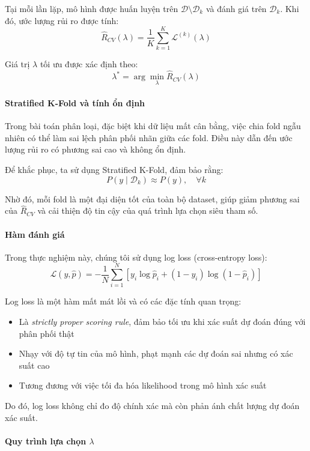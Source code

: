 Tại mỗi lần lặp, mô hình được huấn luyện trên $\mathcal{D} \setminus \mathcal{D}_k$ và đánh giá trên $\mathcal{D}_k$. Khi đó, ước lượng rủi ro được tính:
\[
\hat{R}_{CV}(\lambda) = \frac{1}{K} \sum_{k=1}^{K} \mathcal{L}^{(k)}(\lambda)
\]

Giá trị $\lambda$ tối ưu được xác định theo:
\[
\lambda^* = \arg\min_{\lambda} \hat{R}_{CV}(\lambda)
\]

\paragraph{Stratified K-Fold và tính ổn định}

Trong bài toán phân loại, đặc biệt khi dữ liệu mất cân bằng, việc chia fold ngẫu nhiên có thể làm sai lệch phân phối nhãn giữa các fold. Điều này dẫn đến ước lượng rủi ro có phương sai cao và không ổn định.

Để khắc phục, ta sử dụng Stratified K-Fold, đảm bảo rằng:
\[
P(y \mid \mathcal{D}_k) \approx P(y), \quad \forall k
\]

Nhờ đó, mỗi fold là một đại diện tốt của toàn bộ dataset, giúp giảm phương sai của $\hat{R}_{CV}$ và cải thiện độ tin cậy của quá trình lựa chọn siêu tham số.

\paragraph{Hàm đánh giá}

Trong thực nghiệm này, chúng tôi sử dụng log loss (cross-entropy loss):
\[
\mathcal{L}(y, \hat{p}) = - \frac{1}{N} \sum_{i=1}^{N} \left[ y_i \log \hat{p}_i + (1 - y_i) \log (1 - \hat{p}_i) \right]
\]

Log loss là một hàm mất mát lồi và có các đặc tính quan trọng:
\begin{itemize}
    \item Là \textit{strictly proper scoring rule}, đảm bảo tối ưu khi xác suất dự đoán đúng với phân phối thật
    \item Nhạy với độ tự tin của mô hình, phạt mạnh các dự đoán sai nhưng có xác suất cao
    \item Tương đương với việc tối đa hóa likelihood trong mô hình xác suất
\end{itemize}

Do đó, log loss không chỉ đo độ chính xác mà còn phản ánh chất lượng dự đoán xác suất.

\paragraph{Quy trình lựa chọn $\lambda$}

